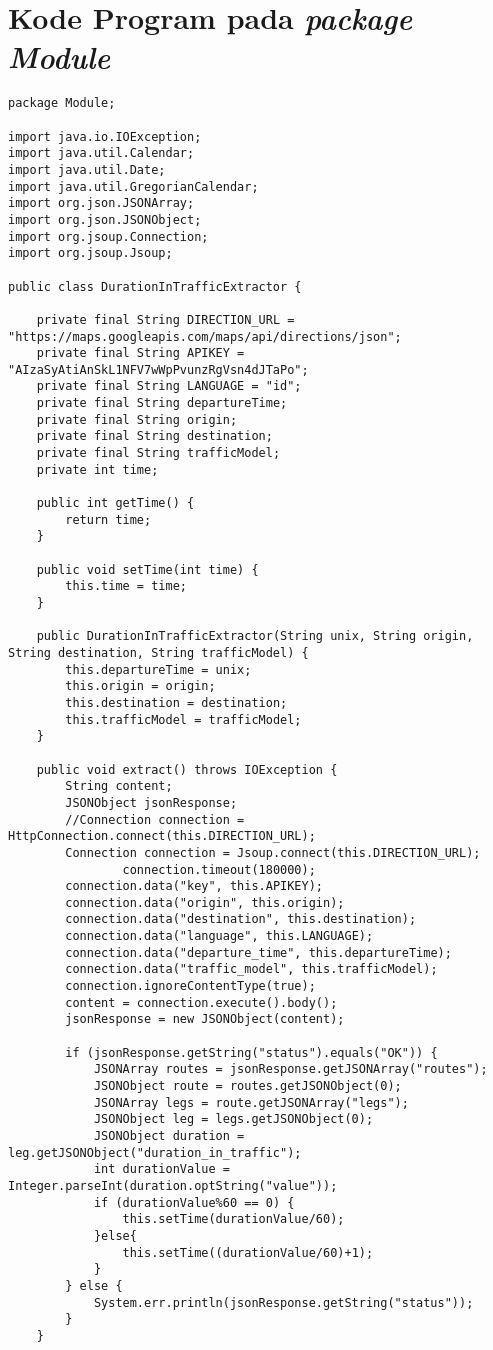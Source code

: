 \chapter{Kode Program pada \textit{package Module}}
\label{chap:kodeprogramA}

\begin{lstlisting}[caption= DurationInTrafficExtractor.java]
package Module;

import java.io.IOException;
import java.util.Calendar;
import java.util.Date;
import java.util.GregorianCalendar;
import org.json.JSONArray;
import org.json.JSONObject;
import org.jsoup.Connection;
import org.jsoup.Jsoup;

public class DurationInTrafficExtractor {

    private final String DIRECTION_URL = "https://maps.googleapis.com/maps/api/directions/json";
    private final String APIKEY = "AIzaSyAtiAnSkL1NFV7wWpPvunzRgVsn4dJTaPo";
    private final String LANGUAGE = "id";
    private final String departureTime;
    private final String origin;
    private final String destination;
    private final String trafficModel;
    private int time;

    public int getTime() {
        return time;
    }

    public void setTime(int time) {
        this.time = time;
    }
    
    public DurationInTrafficExtractor(String unix, String origin, String destination, String trafficModel) {
        this.departureTime = unix;
        this.origin = origin;
        this.destination = destination;
        this.trafficModel = trafficModel;
    }

    public void extract() throws IOException {
        String content;
        JSONObject jsonResponse;
        //Connection connection = HttpConnection.connect(this.DIRECTION_URL);
        Connection connection = Jsoup.connect(this.DIRECTION_URL);
				connection.timeout(180000);
        connection.data("key", this.APIKEY);
        connection.data("origin", this.origin);
        connection.data("destination", this.destination);
        connection.data("language", this.LANGUAGE);
        connection.data("departure_time", this.departureTime);
        connection.data("traffic_model", this.trafficModel);
        connection.ignoreContentType(true);
        content = connection.execute().body();
        jsonResponse = new JSONObject(content);

        if (jsonResponse.getString("status").equals("OK")) {
            JSONArray routes = jsonResponse.getJSONArray("routes");
            JSONObject route = routes.getJSONObject(0);
            JSONArray legs = route.getJSONArray("legs");
            JSONObject leg = legs.getJSONObject(0);
            JSONObject duration = leg.getJSONObject("duration_in_traffic");
            int durationValue = Integer.parseInt(duration.optString("value"));
            if (durationValue%60 == 0) {
                this.setTime(durationValue/60);
            }else{
                this.setTime((durationValue/60)+1);
            }
        } else {
            System.err.println(jsonResponse.getString("status"));
        }
    }


\end{lstlisting}
